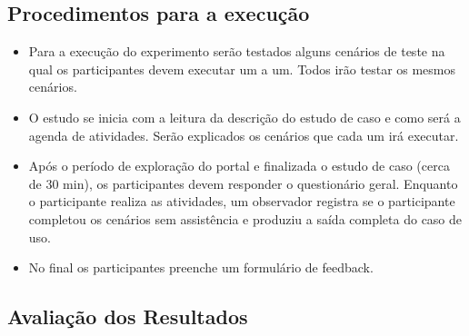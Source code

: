 \begin{table}[h]
\begin{tabular}{|p{5cm} |p{2.5cm}|l|l|}
\end{tabular}
\end{table}

\subsection{Procedimentos para a execução}

\begin{itemize}

\item Para a execução do experimento serão testados alguns cenários de teste na qual os participantes devem executar um a um. Todos irão testar os mesmos cenários.
\item O estudo se inicia com a leitura da descrição do estudo de caso e como será a agenda de atividades. Serão explicados os cenários que cada um irá executar.
\item Após o período de exploração do portal e finalizada o estudo de caso (cerca de 30 min), os participantes devem responder o questionário geral.
Enquanto o participante realiza as atividades, um observador registra se o participante completou os cenários sem assistência e produziu a saída completa do caso de uso.
\item No final os participantes preenche um formulário de feedback.

\end{itemize}

\subsection{Avaliação dos Resultados}

